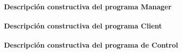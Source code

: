 \paragraph{Descripción constructiva del programa Manager}


\paragraph{Descripción constructiva del programa Client}


\paragraph{Descripción constructiva del programa de Control}

